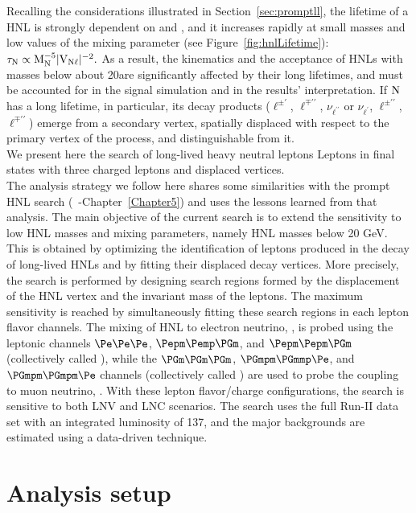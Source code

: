 Recalling the considerations illustrated in Section~\ref{sec:promptll}, the lifetime of a HNL is strongly dependent on \mhnl and \mixpar,
and it increases rapidly at small masses and low values of the mixing
parameter (see Figure~\ref{fig:hnlLifetime}):
\(\tau_\mathrm{N}\propto\mathrm{M_{\mathrm{N}}^{-5}|V_{\mathrm{N}\ell}|^{-2}}.\)
As a result, the kinematics and the acceptance of HNLs with masses
below about 20\GeV are significantly affected by their long lifetimes,
and must be accounted for in the signal simulation and in the results'
interpretation.
If $\mathrm{N}$ has a long lifetime, in particular, its decay products
($\ell^{\pm\prime}$, $\ell^{\mp\prime\prime}$, $\nu_{\ell^{\prime\prime}}$ or
$\nu_{\ell^{\prime}}$, $\ell^{\pm\prime\prime}$, $\ell^{\mp\prime\prime}$)
emerge from a secondary vertex, spatially displaced with respect to
the primary vertex of the process, and distinguishable from it.\\

We present here the search of long-lived heavy neutral leptons Leptons in final states
with three charged leptons and displaced vertices. \\
The analysis strategy we follow here shares some similarities with the
prompt HNL search (~\cite{Sirunyan:2018mtv}-Chapter~\ref{Chapter5})
and uses the lessons learned from that
analysis. 
The main objective of the current search is to extend the
sensitivity to low HNL masses and mixing parameters, namely HNL masses
below 20 GeV. This is obtained by optimizing the identification
of leptons produced in the decay of long-lived HNLs and by fitting
their displaced decay vertices. More precisely, the search is
performed by designing search regions formed by the displacement of
the HNL vertex and the invariant mass of the \displ leptons. The
maximum sensitivity is reached by simultaneously fitting these search
regions in each lepton flavor channels. The mixing of HNL to electron
neutrino, \mixpare, is probed using the leptonic channels 
$\Pe\Pe\Pe$, $\Pepm\Pemp\PGm$, and $\Pepm\Pepm\PGm$ (collectively
called \eex),
while the $\PGm\PGm\PGm$,  $\PGmpm\PGmmp\Pe$, and $\PGmpm\PGmpm\Pe$
channels (collectively called \mmx) are used to probe the coupling to
muon neutrino, \mixparm.
With these lepton flavor/charge configurations, the search is
sensitive to both LNV and LNC scenarios.
The search uses the full Run-II data set with an integrated luminosity
of 137\fbinv, and the major backgrounds are estimated using a
data-driven technique.

\section{Analysis setup}

